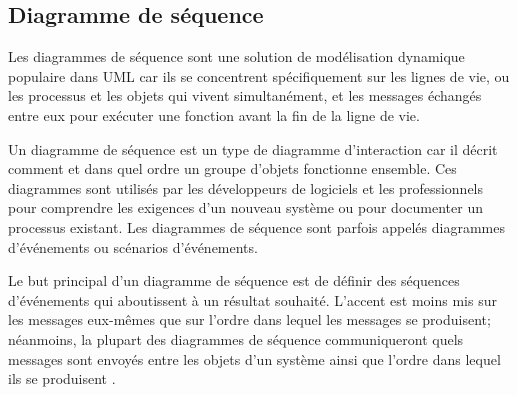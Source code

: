     \subsection{Diagramme de séquence}
    Les diagrammes de séquence sont une solution de modélisation 
    dynamique populaire dans UML car ils se concentrent spécifiquement 
    sur les lignes de vie, ou les processus et les objets qui vivent 
    simultanément, et les messages échangés entre eux pour exécuter 
    une fonction avant la fin de la ligne de vie. 
    \par
    Un diagramme de séquence est un type de diagramme d'interaction car 
    il décrit comment et dans quel ordre un groupe d'objets fonctionne 
    ensemble. Ces diagrammes sont utilisés par les développeurs de 
    logiciels et les professionnels pour comprendre les exigences 
    d'un nouveau système ou pour documenter un processus existant. 
    Les diagrammes de séquence sont parfois appelés diagrammes d'événements 
    ou scénarios d'événements.
    \par 
    Le but principal d'un diagramme de séquence est de définir des séquences 
    d'événements qui aboutissent à un résultat souhaité. L'accent est moins mis 
    sur les messages eux-mêmes que sur l'ordre dans lequel les messages se produisent; 
    néanmoins, la plupart des diagrammes de séquence communiqueront quels messages sont 
    envoyés entre les objets d’un système ainsi que l’ordre dans lequel ils se 
    produisent \cite{citeseqdiag}.
